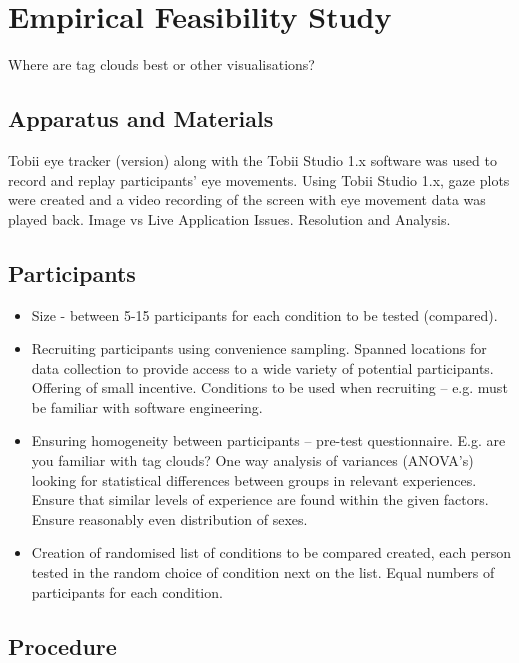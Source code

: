 \chapter{Empirical Feasibility Study}
\ifpdf
    \graphicspath{{Chapter6/Chapter6Figs/PNG/}{Chapter6/Chapter6Figs/PDF/}{Chapter6/Chapter6Figs/}}
\else
    \graphicspath{{Chapter6/Chapter5Figs/EPS/}{Chapter6/Chapter6Figs/}}
\fi

Where are tag clouds best or other visualisations?

\section{Apparatus and Materials}

Tobii eye tracker (version) along with the Tobii Studio 1.x software was used to record and replay participants' eye movements. Using Tobii Studio 1.x, gaze plots were created and a video recording of the screen with eye movement data was played back. Image vs Live Application Issues. Resolution and Analysis.

\section{Participants}

\begin{itemize}
	\item Size - between 5-15 participants for each condition to be tested (compared).
	\item Recruiting participants using convenience sampling.  Spanned locations for data collection to provide access to a wide variety of potential participants. Offering of small incentive.  Conditions to be used when recruiting – e.g. must be familiar with software engineering.
	\item Ensuring homogeneity between participants – pre-test questionnaire. E.g. are you familiar with tag clouds? One way analysis of variances (ANOVA’s) looking for statistical differences between groups in relevant experiences. Ensure that similar levels of experience are found within the given factors. Ensure reasonably even distribution of sexes.
	\item Creation of randomised list of conditions to be compared created, each person tested in the random choice of condition next on the list.  Equal numbers of participants for each condition.
\end{itemize}

\section{Procedure}

